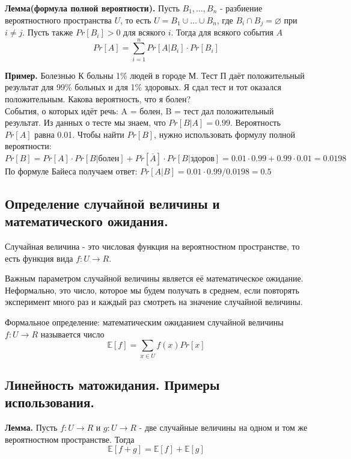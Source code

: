 \documentclass[a4paper, 10pt]{article}
\begin{document}
\textbf{Лемма(формула полной вероятности).} Пусть $B_1, \dots, B_n$ - разбиение вероятностного пространства $U$, то есть $U = B_1 \cup \dots \cup B_n$, где $B_i \cap B_j = \varnothing$ при $i \neq j$. Пусть также $Pr[B_i] > 0$ для всякого $i$. Тогда для всякого события $A$ $$Pr[A] = \sum^n_{i = 1}Pr[A|B_i] \cdot Pr[B_i]$$

\textbf{Пример.} Болезнью К больны 1\% людей в городе М. Тест П даёт положительный результат для 99\% больных и для 1\% здоровых. Я сдал тест и тот оказался положительным. Какова вероятность, что я болен? \\
События, о которых идёт речь: A = болен, B = тест дал положительный результат. Из данных о тесте мы знаем, что $Pr[B|A] = 0.99$. Вероятность $Pr[A]$ равна 0.01. Чтобы найти $Pr[B]$, нужно использовать формулу полной вероятности: \\
$Pr[B] = Pr[A] \cdot Pr[B|\text{болен}] + Pr[\overline{A}] \cdot Pr[B|\text{здоров}] = 0.01 \cdot 0.99 + 0.99 \cdot 0.01 = 0.0198$ \\
По формуле Байеса получаем ответ: $Pr[A|B] = 0.01 \cdot 0.99/0.0198 = 0.5$

\subsection{Определение случайной величины и математического ожидания.}

Случайная величина - это числовая функция на вероятностном пространстве, то есть функция вида $f : U \to R$.

Важным параметром случайной величины является её математическое ожидание. Неформально, это число, которое мы будем получать в среднем, если повторять эксперимент много раз и каждый раз смотреть на значение случайной величины.

Формальное определение: математическим ожиданием случайной величины $f : U \to R$ называется число $$\mathbb{E}[f] = \sum_{x \in U}f(x)Pr[x]$$

\subsection{Линейность матожидания. Примеры использования.}

\textbf{Лемма.} Пусть $f : U \to R$ и $g : U \to R$ - две случайные величины на одном и том же вероятностном пространстве. Тогда $$\mathbb{E}[f + g] = \mathbb{E}[f] + \mathbb{E}[g]$$
\end{document}
